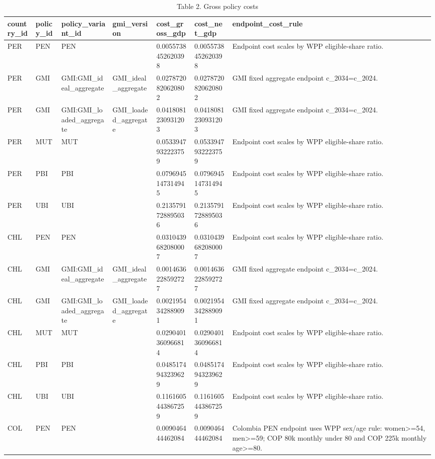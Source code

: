 \begin{table}[!htbp]
\centering
\caption{Table 2. Gross policy costs}
\begin{tabular}{lllllll}
\toprule
country\_id & policy\_id & policy\_variant\_id & gmi\_version & cost\_gross\_gdp & cost\_net\_gdp & endpoint\_cost\_rule \\
\midrule
PER & PEN & PEN &  & 0.0055738452620398 & 0.0055738452620398 & Endpoint cost scales by WPP eligible-share ratio. \\
PER & GMI & GMI:GMI\_ideal\_aggregate & GMI\_ideal\_aggregate & 0.0278720820620802 & 0.0278720820620802 & GMI fixed aggregate endpoint c\_2034=c\_2024. \\
PER & GMI & GMI:GMI\_loaded\_aggregate & GMI\_loaded\_aggregate & 0.0418081230931203 & 0.0418081230931203 & GMI fixed aggregate endpoint c\_2034=c\_2024. \\
PER & MUT & MUT &  & 0.0533947932223759 & 0.0533947932223759 & Endpoint cost scales by WPP eligible-share ratio. \\
PER & PBI & PBI &  & 0.0796945147314945 & 0.0796945147314945 & Endpoint cost scales by WPP eligible-share ratio. \\
PER & UBI & UBI &  & 0.2135791728895036 & 0.2135791728895036 & Endpoint cost scales by WPP eligible-share ratio. \\
CHL & PEN & PEN &  & 0.0310439682080007 & 0.0310439682080007 & Endpoint cost scales by WPP eligible-share ratio. \\
CHL & GMI & GMI:GMI\_ideal\_aggregate & GMI\_ideal\_aggregate & 0.0014636228592727 & 0.0014636228592727 & GMI fixed aggregate endpoint c\_2034=c\_2024. \\
CHL & GMI & GMI:GMI\_loaded\_aggregate & GMI\_loaded\_aggregate & 0.0021954342889091 & 0.0021954342889091 & GMI fixed aggregate endpoint c\_2034=c\_2024. \\
CHL & MUT & MUT &  & 0.0290401360966814 & 0.0290401360966814 & Endpoint cost scales by WPP eligible-share ratio. \\
CHL & PBI & PBI &  & 0.0485174943239629 & 0.0485174943239629 & Endpoint cost scales by WPP eligible-share ratio. \\
CHL & UBI & UBI &  & 0.1161605443867259 & 0.1161605443867259 & Endpoint cost scales by WPP eligible-share ratio. \\
COL & PEN & PEN &  & 0.009046444462084 & 0.009046444462084 & Colombia PEN endpoint uses WPP sex/age rule: women>=54, men>=59; COP 80k monthly under 80 and COP 225k monthly age>=80. \\

\end{tabular}
\end{table}
